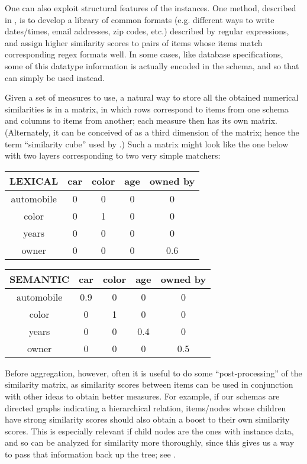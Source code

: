 \documentclass{datamade}
\theoremstyle{definition}
\theoremstyle{remark}
\begin{document}
One can also exploit structural features of the instances. One method, described in \cite{regex}, is to develop a library of common formats (e.g. different ways to write dates/times, email addresses, zip codes, etc.) described by regular expressions, and assign higher similarity scores to pairs of items whose items match corresponding regex formats well. In some cases, like database specifications, some of this datatype information is actually encoded in the schema, and so that can simply be used instead.

Given a set of measures to use, a natural way to store all the obtained numerical similarities is in a matrix, in which rows correspond to items from one schema and columns to items from another; each measure then has its own matrix. (Alternately, it can be conceived of as a third dimension of the matrix; hence the term ``similarity cube'' used by \cite{coma}.) Such a matrix might look like the one below with two layers corresponding to two very simple matchers:

\begin{tabular}{|c|c|c|c|c|}
	\hline
LEXICAL & car & color & age & owned by \\\hline
automobile & 0 & 0 & 0 & 0 \\\hline
color & 0 & 1 & 0 & 0 \\\hline
years & 0 & 0 & 0 & 0 \\\hline
owner & 0 & 0 & 0 & 0.6 \\\hline
\end{tabular}

\begin{tabular}{|c|c|c|c|c|}
	\hline
	SEMANTIC & car & color & age & owned by \\\hline
	automobile & 0.9 & 0 & 0 & 0 \\\hline
	color & 0 & 1 & 0 & 0 \\\hline
	years & 0 & 0 & 0.4 & 0 \\\hline
	owner & 0 & 0 & 0 & 0.5 \\\hline
\end{tabular}


Before aggregation, however, often it is useful to do some ``post-processing'' of the similarity matrix, as similarity scores between items can be used in conjunction with other ideas to obtain better measures. For example, if our schemas are directed graphs indicating a hierarchical relation, items/nodes whose children have strong similarity scores should also obtain a boost to their own similarity scores. This is especially relevant if child nodes are the ones with instance data, and so can be analyzed for similarity more thoroughly, since this gives us a way to pass that information back up the tree; see \cite{comainstance}. 
\end{document}
